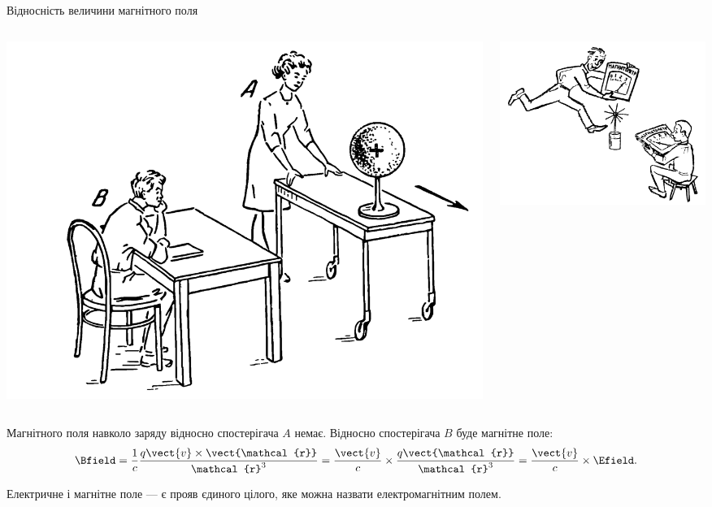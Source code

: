 \documentclass{beamer}
\begin{document}
\begin{frame}{Відносність величини магнітного поля}{}
	\begin{columns}
		\begin{column}{0.5\linewidth}
			\includegraphics[width=0.85\linewidth]{MagFieldRelativity}
		\end{column}
		\begin{column}{0.5\linewidth}
			\includegraphics[width=0.85\linewidth]{MagFieldRelativity2}
		\end{column}
	\end{columns}
	\begin{block}{}
		Магнітного поля навколо заряду відносно спостерігача $A$ немає. Відносно спостерігача $B$ буде магнітне поле:
		\begin{equation*}
			\Bfield = \frac1c \frac{q\vect{v}\times\vect{\mathcal{r}}}{\mathcal{r}^3} =
			\frac{\vect{v}}{c}\times\frac{q\vect{\mathcal{r}}}{\mathcal{r}^3} = \frac{\vect{v}}{c}\times\Efield.
		\end{equation*}
	\end{block}
	\begin{alertblock}{}\centering
		Електричне і магнітне поле --- є прояв єдиного цілого, яке можна назвати \alert{електромагнітним полем}.
	\end{alertblock}
\end{frame}
\end{document}
